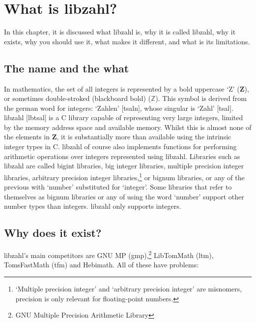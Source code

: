 \chapter{What is libzahl?}
\label{chap:What is libzahl?}

In this chapter, it is discussed what libzahl is,
why it is called libzahl, why it exists, why
you should use it, what makes it different, and
what is its limitations.

\vspace{1cm}
\minitoc


\newpage
\section{The name and the what}
\label{sec:The name and the what}

In mathematics, the set of all integers is represented
by a bold uppercase `Z' ({\bf Z}), or sometimes              %
double-stroked (blackboard bold) ($\mathbb{Z}$). This symbol %
is derived from the german word for integers: `Zahlen'
[\textprimstress{}tsa\textlengthmark{}l\textschwa{}n],
whose singular is `Zahl' [tsa\textlengthmark{}l]. libzahl
[l\textsecstress{}\textsci{}b\textprimstress{}tsa\textlengthmark{}l]
is a C library capable of representing very large integers,
limited by the memory address space and available memory.
Whilst this is almost none of the elements in {\bf Z},
it is substantially more than available using the intrinsic
integer types in C. libzahl of course also implements
functions for performing arithmetic operations over
integers represented using libzahl. Libraries such as
libzahl are called bigint libraries, big integer libraries,
multiple precision integer libraries, arbitrary precision
integer libraries,\footnote{`Multiple precision integer'
and `arbitrary precision integer' are misnomers, precision
is only relevant for floating-point numbers.} or bignum
libraries, or any of the previous with `number' substituted
for `integer'. Some libraries that refer to themselves as bignum
libraries or any of using the word `number' support other
number types than integers. libzahl only supports integers.


\newpage
\section{Why does it exist?}
\label{sec:Why does it exist?}

libzahl's main competitors are GNU MP (gmp),\footnote{GNU
Multiple Precision Arithmetic Library} LibTomMath (ltm),
TomsFastMath (tfm) and Hebimath. All of these have problems:


